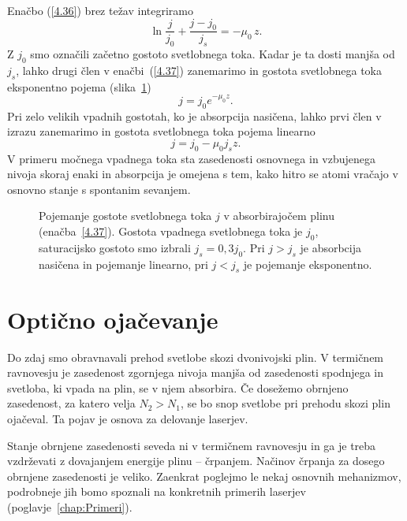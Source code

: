 Enačbo (\ref{4.36}) brez težav integriramo
\begin{equation}
\ln\frac{j}{j_{0}}+\frac{j-j_{0}}{j_{s}}=-\mu_{0}\, z.
\label{4.37}
\end{equation}
Z $j_{0}$ smo označili začetno gostoto svetlobnega toka. Kadar je ta dosti
manjša od $j_{s}$, lahko drugi člen v enačbi~(\ref{4.37}) zanemarimo in gostota svetlobnega
toka eksponentno pojema (slika~\ref{fig:abs2})
\begin{equation}
j = j_0 e^{-\mu_0 z}.
\end{equation}
Pri zelo velikih vpadnih gostotah, ko je absorpcija nasičena, lahko prvi člen v izrazu 
zanemarimo in gostota svetlobnega toka pojema linearno
\begin{equation}
j=j_{0}-\mu_{0}j_{s}z.
\label{4.38}
\end{equation}
V primeru močnega vpadnega toka sta zasedenosti osnovnega in vzbujenega nivoja skoraj
enaki in absorpcija je omejena s tem, kako hitro se atomi vračajo
v osnovno stanje s spontanim sevanjem. 

\begin{figure}[h]
\centering
\def\svgwidth{90truemm} 

\caption{Pojemanje gostote svetlobnega toka $j$ v absorbirajočem plinu (enačba~\ref{4.37}). 
Gostota vpadnega svetlobnega toka je $j_0$, saturacijsko
gostoto smo izbrali $j_s = 0,3 j_0$. Pri $j>j_s$ je absorbcija nasičena in pojemanje linearno, 
pri $j<j_s$ je pojemanje eksponentno.}
\label{fig:abs2}
\end{figure}

\section{Optično ojačevanje}
Do zdaj smo obravnavali prehod svetlobe skozi dvonivojski plin. V 
termičnem ravnovesju je zasedenost zgornjega nivoja manjša od zasedenosti spodnjega in 
svetloba, ki vpada na plin, se v njem absorbira. 
Če dosežemo  obrnjeno zasedenost,
za katero velja $N_{2}>N_{1}$, se bo snop svetlobe pri prehodu skozi plin ojačeval. Ta pojav
je osnova za delovanje laserjev. 

Stanje obrnjene zasedenosti seveda ni v termičnem ravnovesju in ga je treba vzdrževati z dovajanjem 
energije plinu -- črpanjem.
Načinov črpanja za dosego obrnjene zasedenosti je veliko. Zaenkrat poglejmo
le nekaj osnovnih mehanizmov, podrobneje jih bomo spoznali na konkretnih primerih 
laserjev (poglavje~\ref{chap:Primeri}).

